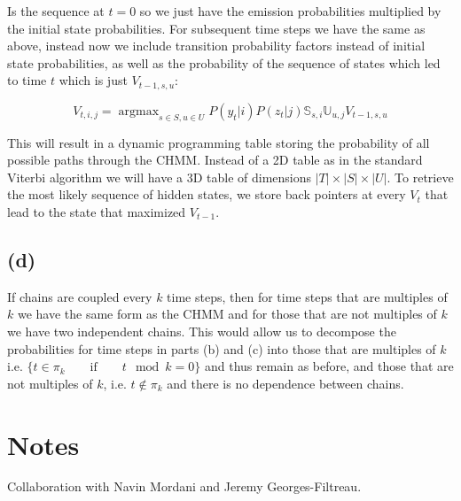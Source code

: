 \documentclass[11pt]{amsart}
\DeclareMathOperator*{\argmax}{argmax}
\begin{document}
Is the sequence at $t=0$ so we just have the emission probabilities multiplied by the initial state probabilities. For subsequent time steps we have the same as above, instead now we include transition probability factors instead of initial state probabilities, as well as the probability of the sequence of states which led to time $t$ which is just $V_{t-1, s, u}$:

\begin{equation}
V_{t, i, j} = \argmax_{s \in S, u \in U} P(y_t \vert i) P(z_t \vert j) \mathbb{S}_{s, i} \mathbb{U}_{u, j} V_{t-1, s, u}
\end{equation}

This will result in a dynamic programming table storing the probability of all possible paths through the CHMM. Instead of a 2D table as in the standard Viterbi algorithm we will have a 3D table of dimensions $|T| \times |S| \times |U|$. To retrieve the most likely sequence of hidden states, we store back pointers at every $V_t$ that lead to the state that maximized $V_{t-1}$. 

\subsection{(d)}

If chains are coupled every $k$ time steps, then for time steps that are multiples of $k$ we have the same form as the CHMM and for those that are not multiples of $k$ we have two independent chains. This would allow us to decompose the probabilities for time steps in parts (b) and (c) into those that are multiples of $k$ i.e. $\{ t \in \pi_{k} \qquad \text{if} \qquad t \mod k = 0 \}$  and thus remain as before, and those that are not multiples of $k$, i.e. $t \notin \pi_k$ and there is no dependence between chains.



\section{Notes}
Collaboration with Navin Mordani and Jeremy Georges-Filtreau.



\end{document}
